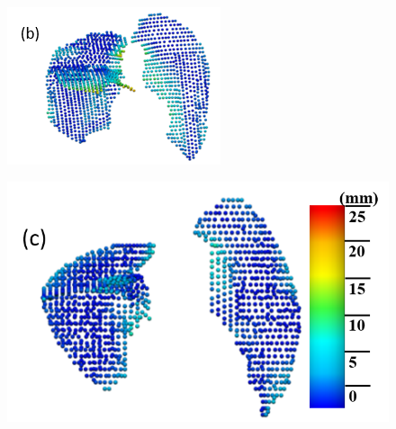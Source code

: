 \documentclass[]{spie}  %
\begin{document}
{\begin{figure}[htbp]
\begin{subfigure}
{\begin{minipage}[t]{0.19\linewidth}
  \includegraphics[width=\linewidth,trim={{.0\wd0} {.0\wd0} {.0\wd0} {.0\wd0}},clip]{Image/QuanlititativeResult2.png}
  \centerline{}
	\end{minipage}%
   }%
  \label{fig:QuanlititativeResult-b} 
\end{subfigure}
\begin{subfigure}{
  \begin{minipage}[t]{0.24\linewidth}
  \includegraphics[width=\linewidth,trim={{.0\wd0} {.0\wd0} {.0\wd0} {.0\wd0}},clip]{Image/QuanlititativeResult3.png}

\end{minipage}}
\end{subfigure}
\end{figure}}
\end{document}
